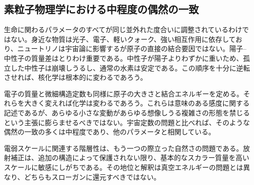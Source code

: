 \begin{classroomqa}
\end{classroomqa}

\begin{classroomqa}
\end{classroomqa}

\subsection{素粒子物理学における中程度の偶然の一致}

生命に関わるパラメータのすべてが同じ並外れた度合いに調整されているわけではない。身近な物質は光子、電子、軽いクォーク、強い相互作用に依存しており、ニュートリノは宇宙論に影響するが原子の直接の結合要因ではない。陽子--中性子の質量差はとりわけ重要である。中性子が陽子よりわずかに重いため、孤立した中性子は崩壊しうるし、通常の水素は安定である。この順序を十分に逆転させれば、核化学は根本的に変わるであろう。

電子の質量と微細構造定数も同様に原子の大きさと結合エネルギーを定める。それらを大きく変えれば化学は変わるであろう。これらは意味のある感度に関する記述であるが、あらゆる小さな変動があらゆる想像しうる複雑さの形態を禁じるという主張に膨らませるべきではない。宇宙定数の問題と比べれば、そのような偶然の一致の多くは中程度であり、他のパラメータと相関している。

電弱スケールに関連する階層性は、もう一つの際立った自然さの問題である。放射補正は、追加の構造によって保護されない限り、基本的なスカラー質量を高いスケールに敏感にしがちである。その地位と解釈は真空エネルギーの問題とは異なり、どちらもスローガンに還元すべきではない。

\begin{classroomqa}
\end{classroomqa}

